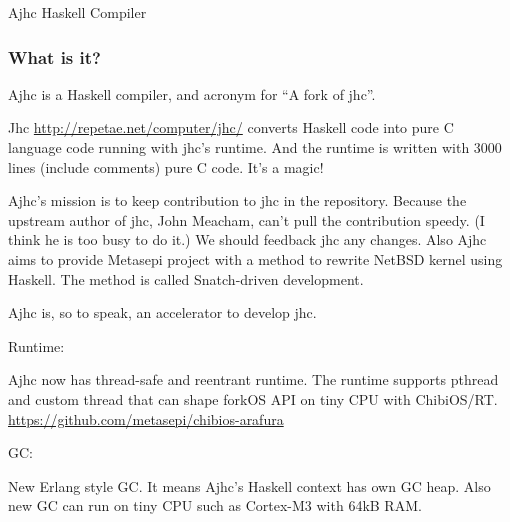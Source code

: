\documentclass[DIV16,twocolumn,10pt]{scrreprt}
\begin{document}
\begin{hcarentry}{Ajhc Haskell Compiler}
\makeheader

\newcommand{\WhatsIsIt}{\subsubsection*{What is it?}}
\newcommand{\Usage}{\subsubsection*{Usage}}
\newcommand{\License}{\subsubsection*{License}}
\newcommand{\Demo}{\subsubsection*{Demonstrations}}

\WhatsIsIt

Ajhc is a Haskell compiler, and acronym for ``A fork of jhc''.

Jhc \url{http://repetae.net/computer/jhc/} converts Haskell code into pure C language code running with jhc's runtime. And the runtime is written with 3000 lines (include comments) pure C code. It's a magic!

Ajhc's mission is to keep contribution to jhc in the repository. Because the upstream author of jhc, John Meacham, can't pull the contribution speedy. (I think he is too busy to do it.) We should feedback jhc any changes. Also Ajhc aims to provide Metasepi project with a method to rewrite NetBSD kernel using Haskell. The method is called Snatch-driven development.

Ajhc is, so to speak, an accelerator to develop jhc.

\WhatsNew

\noindent Runtime:

Ajhc now has thread-safe and reentrant runtime.
The runtime supports pthread and custom thread
that can shape forkOS API on tiny CPU with ChibiOS/RT.
\url{https://github.com/metasepi/chibios-arafura}

\vspace*{10pt}

\noindent GC:

New Erlang style GC. It means Ajhc's Haskell context has own GC heap.
Also new GC can run on tiny CPU such as Cortex-M3 with 64kB RAM.


\end{hcarentry}
\end{document}
